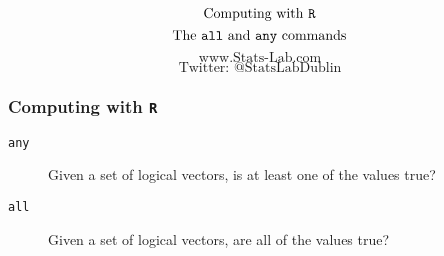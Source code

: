 \documentclass{beamer}
\begin{document}
\begin{frame}
\Huge
\[ \mbox{Computing with \texttt{R}} \]
\LARGE
\[ \mbox{The \texttt{all} and \texttt{any} commands} \]
\bigskip
\Large
\[ \mbox{www.Stats-Lab.com} \]
\[ \mbox{Twitter: @StatsLabDublin} \]
\bigskip

\end{frame}
\begin{frame}
\Large
\frametitle{Computing with \texttt{R}}
\begin{description}

\item[\texttt{any}] Given a set of logical vectors, is at least one of the values true? 

\item[\texttt{all}] Given a set of logical vectors, are all of the values true? 

\end{description}

\end{frame}
\end{document}
